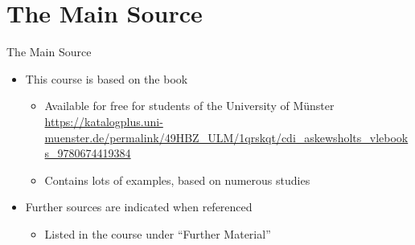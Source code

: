 \documentclass{ercisbeamer}
\begin{document}
\section{The Main Source}
\begin{frame}{The Main Source}
    \begin{itemize}
        \item This course is based on the book 
        \begin{itemize}
            \item Available for free for students of the University of Münster  \\ \url{https://katalogplus.uni-muenster.de/permalink/49HBZ_ULM/1qrskqt/cdi_askewsholts_vlebooks_9780674419384}
            \item Contains lots of examples, based on numerous studies
        \end{itemize}
        \item Further sources are indicated when referenced
        \begin{itemize}
            \item Listed in the course under ``Further Material''
        \end{itemize}
    \end{itemize}


\end{frame}
\end{document}

